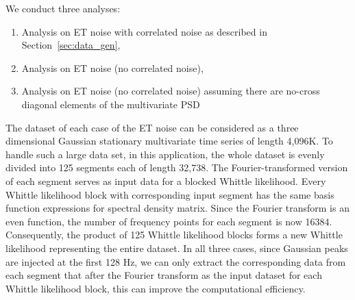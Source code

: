 \documentclass[%
 reprint,
 amsmath,amssymb,
 aps,
 nofootinbib,
]{revtex4-2}
\begin{document}
We conduct three analyses:
\begin{enumerate}[label=Case \arabic*:] 
    \item Analysis on ET noise with correlated noise as described in Section~\ref{sec:data_gen},
    \item Analysis on ET noise (no correlated noise), 
    \item Analysis on ET noise (no correlated noise) assuming there are no-cross diagonal elements of the multivariate PSD 
\end{enumerate}

The dataset of each case of the ET noise can be considered as a three dimensional Gaussian stationary multivariate time series of length 4,096K. 
To handle such a large data set, in this application, the whole dataset is evenly divided into 125 segments each of length 32,738.
The Fourier-transformed version of each segment serves as input data for a blocked Whittle likelihood. 
Every Whittle likelihood block with corresponding input segment has the same basis function expressions for spectral density matrix. 
Since the Fourier transform is an even function, the number of frequency points for each segment is now 16384. 
Consequently, the product of 125 Whittle likelihood blocks forms a new Whittle likelihood representing  the entire dataset. 
In all three cases, since Gaussian peaks are injected at the first 128 Hz, we can only extract the corresponding data from each segment that after the Fourier transform as the input dataset for each Whittle likelihood block, this can improve the computational efficiency.
\end{document}

